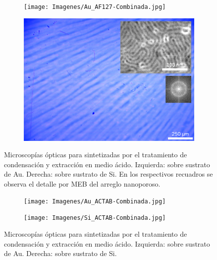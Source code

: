      	     \begin{figure}[tbh!]
	 	   	    \begin{subfigure}[t]{0.49\textwidth}
		       	\texttt{[image: Imagenes/Au\_AF127-Combinada.jpg]}
		   		\end{subfigure}
		   		\begin{subfigure}[t]{0.49\textwidth}
		   	    \includegraphics[width=\textwidth]{Imagenes/Si_AF127-Combinada.jpg}
		   		\end{subfigure}
				 \caption[Microscopía óptica \pdmF tratamiento en medio ácido.]{Microscopías ópticas para \pdmF\space sintetizadas por el tratamiento de condensación y extracción en medio ácido. Izquierda: sobre sustrato de Au. Derecha: sobre sustrato de Si. En los respectivos recuadros se observa el detalle por MEB del arreglo nanoporoso.}
				 \label{fig:Microscopia_F127_acido}	
			     \end{figure}
   		
   			\begin{figure}[tbh!]
 	   	    \begin{subfigure}[t]{0.49\textwidth}
	       	\texttt{[image: Imagenes/Au\_ACTAB-Combinada.jpg]}
	   		\end{subfigure}
	   		\begin{subfigure}[t]{0.49\textwidth}
	   	    \texttt{[image: Imagenes/Si\_ACTAB-Combinada.jpg]}
	   		\end{subfigure}
			 \caption[Microscopía óptica \pdmC tratamiento en medio ácido.]{Microscopías ópticas para \pdmC\space sintetizadas por el tratamiento de condensación y extracción en medio ácido. Izquierda: sobre sustrato de Au. Derecha: sobre sustrato de Si.}
			 \label{fig:Microscopia_CTAB_acido}	
		     \end{figure}
   		
